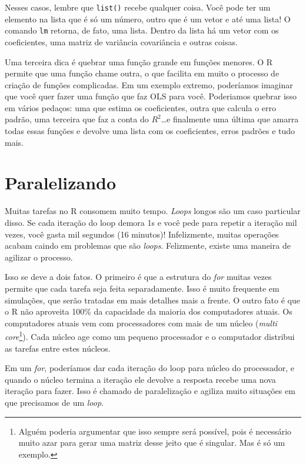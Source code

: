 \documentclass[]{book}
\let\rmarkdownfootnote\footnote%
\def\footnote{\protect\rmarkdownfootnote}
\begin{document}
Nesses casos, lembre que \texttt{list()} recebe qualquer coisa. Você
pode ter um elemento na lista que é só um número, outro que é um vetor e
até uma lista! O comando \texttt{lm} retorna, de fato, uma lista. Dentro
da lista há um vetor com os coeficientes, uma matriz de variância
covariância e outras coisas.

Uma terceira dica é quebrar uma função grande em funções menores. O R
permite que uma função chame outra, o que facilita em muito o processo
de criação de funções complicadas. Em um exemplo extremo, poderíamos
imaginar que você quer fazer uma função que faz OLS para você.
Poderiamos quebrar isso em vários pedaços: uma que estima os
coeficientes, outra que calcula o erro padrão, uma terceira que faz a
conta do \(R^2\)\ldots{}e finalmente uma última que amarra todas essas
funções e devolve uma lista com os coeficientes, erros padrões e tudo
mais.

\chapter{Paralelizando}\label{paralelizando}

Muitas tarefas no R consomem muito tempo. \emph{Loops} longos são um
caso particular disso. Se cada iteração do loop demora 1s e você pede
para repetir a iteração mil vezes, você gasta mil segundos (16 minutos)!
Infelizmente, muitas operações acabam caindo em problemas que são
\emph{loops}. Felizmente, existe uma maneira de agilizar o processo.

Isso se deve a dois fatos. O primeiro é que a estrutura do \emph{for}
muitas vezes permite que cada tarefa seja feita separadamente. Isso é
muito frequente em simulações, que serão tratadas em mais detalhes mais
a frente. O outro fato é que o R não aproveita 100\% da capacidade da
maioria dos computadores atuais. Os computadores atuais vem com
processadores com mais de um núcleo (\emph{multi core}\footnote{Alguém
  poderia argumentar que isso sempre será possível, pois é necessário
  muito azar para gerar uma matriz desse jeito que é singular. Mas é só
  um exemplo.}). Cada núcleo age como um pequeno processador e o
computador distribui as tarefas entre estes núcleos.

Em um \emph{for}, poderíamos dar cada iteração do loop para núcleo do
processador, e quando o núcleo termina a iteração ele devolve a resposta
recebe uma nova iteração para fazer. Isso é chamado de paralelização e
agiliza muito situações em que precisamos de um \emph{loop}.
\end{document}
